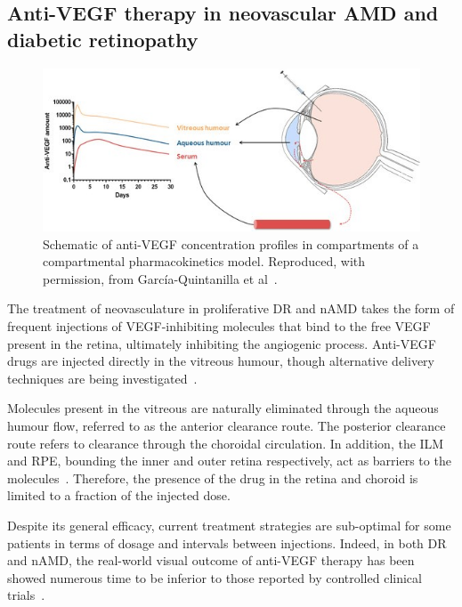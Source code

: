 \documentclass{article}
\begin{document}
\subsection{Anti-VEGF therapy in neovascular AMD and diabetic retinopathy}\label{sec:Anti-VEGF}

\begin{figure}[t!]
  \centering
  \includegraphics{AntiVEGF}
  \caption{Schematic of anti-VEGF concentration profiles in compartments of a compartmental pharmacokinetics model. Reproduced, with permission, from Garc\'ia-Quintanilla et al~\cite{GarciaQuintanilla_2019}.}
  \label{fig:AntiVEGF}
\end{figure}

The treatment of neovasculature in proliferative DR and nAMD takes the form of frequent injections of VEGF-inhibiting molecules that bind to the free VEGF present in the retina, ultimately inhibiting the angiogenic process.
Anti-VEGF drugs are injected directly in the vitreous humour, though alternative delivery techniques are being investigated~\cite{Kim_2021}.

Molecules present in the vitreous are naturally eliminated through the aqueous humour flow, referred to as the anterior clearance route.
The posterior clearance route refers to clearance through the choroidal circulation.
In addition, the ILM and RPE, bounding the inner and outer retina respectively, act as barriers to the molecules~\cite{Park_2015}.
Therefore, the presence of the drug in the retina and choroid is limited to a fraction of the injected dose. 

Despite its general efficacy, current treatment strategies are sub-optimal for some patients in terms of dosage and intervals between injections.
Indeed, in both DR and nAMD, the real-world visual outcome of anti-VEGF therapy has been showed numerous time to be inferior to those reported by controlled clinical trials~\cite{Ciulla_2018, Ciulla_2020, Ozturk_2017}.
\end{document}
